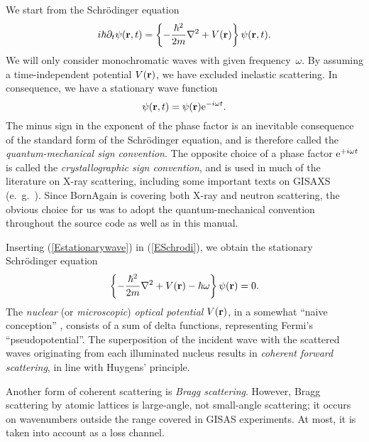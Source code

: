 We start from the Schrödinger equation
\begin{equation}\label{ESchrodi}
  i\hbar\partial_t \psi(\mathbf{r},t)
  = \left\{-\frac{\hbar^2}{2m}\mathbf{\nabla}^2+V(\mathbf{r})\right\} \psi(\mathbf{r},t).
\end{equation}
We will only consider monochromatic waves with given frequency~$\omega$.
By assuming a time-independent potential $V(\mathbf{r})$,
we have excluded inelastic scattering.
In consequence, we have a stationary wave function
\begin{equation}\label{Estationarywave}
  \psi(\mathbf{r},t) = \psi(\mathbf{r}){\rm e}^{-i\omega t}.
\end{equation}
The minus sign in the exponent of the phase factor
is an inevitable consequence of the standard form of the Schrödinger equation,
and is therefore called the \textit{quantum-mechanical sign convention}.
The opposite choice of a phase factor ${\rm e}^{+i\omega t}$ is 
called the \textit{crystallographic sign convention},
and is used in much of the literature on X-ray scattering,
including some important texts on GISAXS (e.~g.\ \cite{ReLL09}).
Since BornAgain is covering both X-ray and neutron scattering,
the obvious choice for us was to adopt the quantum-mechanical convention
throughout the source code as well as in this manual.

Inserting (\ref{Estationarywave}) in (\ref{ESchrodi}),
we obtain the stationary Schrödinger equation
\begin{equation}\label{EstatSchrodi}
  \left\{-\frac{\hbar^2}{2m}\mathbf{\nabla}^2+V(\mathbf{r})-\hbar\omega\right\} \psi(\mathbf{r}) = 0.
\end{equation}
The \textit{nuclear} (or \textit{microscopic})
\textit{optical potential} $V(\mathbf{r})$,
in a somewhat ``naive conception'' \cite[p.~7]{Sea89},
consists of a sum of delta functions,
representing Fermi's ``pseudopotential''.
The superposition of the incident wave with the scattered waves
originating from each illuminated nucleus
results in \textit{coherent forward scattering},%
in line with Huygens' principle.%

Another form of coherent scattering is \textit{Bragg scattering}.%
However, Bragg scattering by atomic lattices
is large-angle, not small-angle scattering;
it occurs on wavenumbers outside the range covered in GISAS experiments.
At most, it is taken into account as a loss channel.

